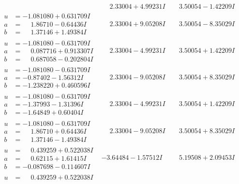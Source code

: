\documentclass[1p]{elsarticle_modified}
\theoremstyle{definition}
\begin{document}
$$\begin{array}{c|c|c}
 & \phantom{-}2.33004 + 4.99231 I & \phantom{-}3.50054 - 1.42209 I \\ \hline\begin{aligned}
u &= -1.081080 + 0.631709 I \\
a &= \phantom{-}1.86710 - 0.64436 I \\
b &= \phantom{-}1.37146 + 1.49384 I\end{aligned}
 & \phantom{-}2.33004 + 9.05208 I & \phantom{-}3.50054 - 8.35029 I \\ \hline\begin{aligned}
u &= -1.081080 - 0.631709 I \\
a &= \phantom{-}0.087716 + 0.913307 I \\
b &= \phantom{-}0.687058 - 0.202804 I\end{aligned}
 & \phantom{-}2.33004 - 4.99231 I & \phantom{-}3.50054 + 1.42209 I \\ \hline\begin{aligned}
u &= -1.081080 - 0.631709 I \\
a &= -0.87402 - 1.56312 I \\
b &= -1.238220 + 0.460596 I\end{aligned}
 & \phantom{-}2.33004 - 9.05208 I & \phantom{-}3.50054 + 8.35029 I \\ \hline\begin{aligned}
u &= -1.081080 - 0.631709 I \\
a &= -1.37993 - 1.31396 I \\
b &= -1.64849 + 0.60404 I\end{aligned}
 & \phantom{-}2.33004 - 4.99231 I & \phantom{-}3.50054 + 1.42209 I \\ \hline\begin{aligned}
u &= -1.081080 - 0.631709 I \\
a &= \phantom{-}1.86710 + 0.64436 I \\
b &= \phantom{-}1.37146 - 1.49384 I\end{aligned}
 & \phantom{-}2.33004 - 9.05208 I & \phantom{-}3.50054 + 8.35029 I \\ \hline\begin{aligned}
u &= \phantom{-}0.439259 + 0.522038 I \\
a &= \phantom{-}0.62115 + 1.61415 I \\
b &= -0.087698 - 0.114607 I\end{aligned}
 & -3.64484 - 1.57512 I & \phantom{-}5.19508 + 2.09453 I \\ \hline\begin{aligned}
u &= \phantom{-}0.439259 + 0.522038 I \\

\end{aligned}
\end{array}$$
\end{document}
